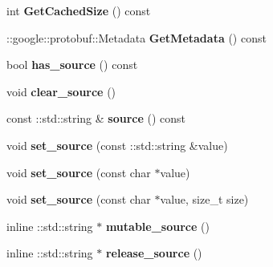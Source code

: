 \begin{DoxyCompactItemize}
int {\bfseries Get\+Cached\+Size} () const
\item 
\mbox{\label{classcaffe_1_1_data_parameter_a88c41071ea7f15e0c7a69b29c721b84e}} 
\+::google\+::protobuf\+::\+Metadata {\bfseries Get\+Metadata} () const
\item 
\mbox{\label{classcaffe_1_1_data_parameter_ab4719729d242a53200938f6c3b8145a6}} 
bool {\bfseries has\+\_\+source} () const
\item 
\mbox{\label{classcaffe_1_1_data_parameter_ae619247e83cc5ddd0dabe316f500689d}} 
void {\bfseries clear\+\_\+source} ()
\item 
\mbox{\label{classcaffe_1_1_data_parameter_a219a3a3089985b34b4f90b8723fc4822}} 
const \+::std\+::string \& {\bfseries source} () const
\item 
\mbox{\label{classcaffe_1_1_data_parameter_a3284b618efaa87ad3fbbd74f6941dca7}} 
void {\bfseries set\+\_\+source} (const \+::std\+::string \&value)
\item 
\mbox{\label{classcaffe_1_1_data_parameter_a4db7080dac9f2b616703434eccc58d6f}} 
void {\bfseries set\+\_\+source} (const char $\ast$value)
\item 
\mbox{\label{classcaffe_1_1_data_parameter_ac199cfdb8beb67c087530aea79965286}} 
void {\bfseries set\+\_\+source} (const char $\ast$value, size\+\_\+t size)
\item 
\mbox{\label{classcaffe_1_1_data_parameter_a8206b71e4286217e6b0cccc864528be9}} 
inline \+::std\+::string $\ast$ {\bfseries mutable\+\_\+source} ()
\item 
\mbox{\label{classcaffe_1_1_data_parameter_adaa0e41933d7063c17f943f47e6e2bc2}} 
inline \+::std\+::string $\ast$ {\bfseries release\+\_\+source} ()
\item 
\mbox{\label{classcaffe_1_1_data_parameter_ad9990fab3ff78bf687919b60f04d669e}} 

\end{DoxyCompactItemize}
